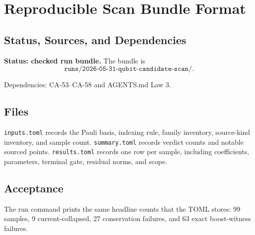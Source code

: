 
\section{Reproducible Scan Bundle Format}
\label{sec:qubit-candidate-scan-run-bundle}

\subsection{Status, Sources, and Dependencies}

\textbf{Status: checked run bundle.}  The bundle is
\[
  \texttt{runs/2026-05-31-qubit-candidate-scan/}.
\]

Dependencies: CA-53--CA-58 and AGENTS.md Law 3.


\subsection{Files}

\texttt{inputs.toml} records the Pauli basis, indexing rule, family inventory,
source-kind inventory, and sample count.  \texttt{summary.toml} records verdict
counts and notable sourced points.  \texttt{results.toml} records one row per
sample, including coefficients, parameters, terminal gate, residual norms, and
scope.

\subsection{Acceptance}

The run command prints the same headline counts that the TOML stores:
99 samples, 9 current-collapsed, 27 conservation failures, and 63 exact
boost-witness failures.
